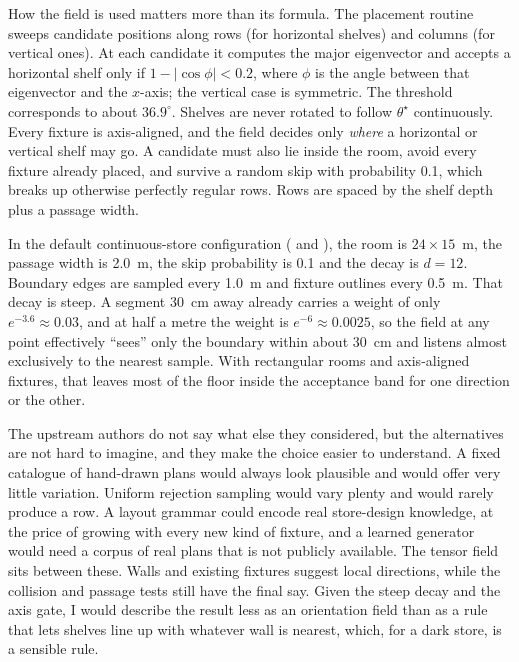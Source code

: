 How the field is used matters more than its formula. The placement routine sweeps candidate positions along rows (for horizontal shelves) and columns (for vertical ones). At each candidate it computes the major eigenvector and accepts a horizontal shelf only if $1-\lvert\cos\phi\rvert<0.2$, where $\phi$ is the angle between that eigenvector and the $x$-axis; the vertical case is symmetric. The threshold corresponds to about $36.9^{\circ}$. Shelves are never rotated to follow $\theta^\star$ continuously. Every fixture is axis-aligned, and the field decides only \emph{where} a horizontal or vertical shelf may go. A candidate must also lie inside the room, avoid every fixture already placed, and survive a random skip with probability 0.1, which breaks up otherwise perfectly regular rows. Rows are spaced by the shelf depth plus a passage width.

In the default continuous-store configuration ( and ), the room is $24\times15$~m, the passage width is 2.0~m, the skip probability is 0.1 and the decay is $d=12$. Boundary edges are sampled every 1.0~m and fixture outlines every 0.5~m. That decay is steep. A segment 30~cm away already carries a weight of only $e^{-3.6}\approx0.03$, and at half a metre the weight is $e^{-6}\approx0.0025$, so the field at any point effectively ``sees'' only the boundary within about 30~cm and listens almost exclusively to the nearest sample. With rectangular rooms and axis-aligned fixtures, that leaves most of the floor inside the acceptance band for one direction or the other.

The upstream authors do not say what else they considered, but the alternatives are not hard to imagine, and they make the choice easier to understand. A fixed catalogue of hand-drawn plans would always look plausible and would offer very little variation. Uniform rejection sampling would vary plenty and would rarely produce a row. A layout grammar could encode real store-design knowledge, at the price of growing with every new kind of fixture, and a learned generator would need a corpus of real plans that is not publicly available. The tensor field sits between these. Walls and existing fixtures suggest local directions, while the collision and passage tests still have the final say. Given the steep decay and the axis gate, I would describe the result less as an orientation field than as a rule that lets shelves line up with whatever wall is nearest, which, for a dark store, is a sensible rule.

